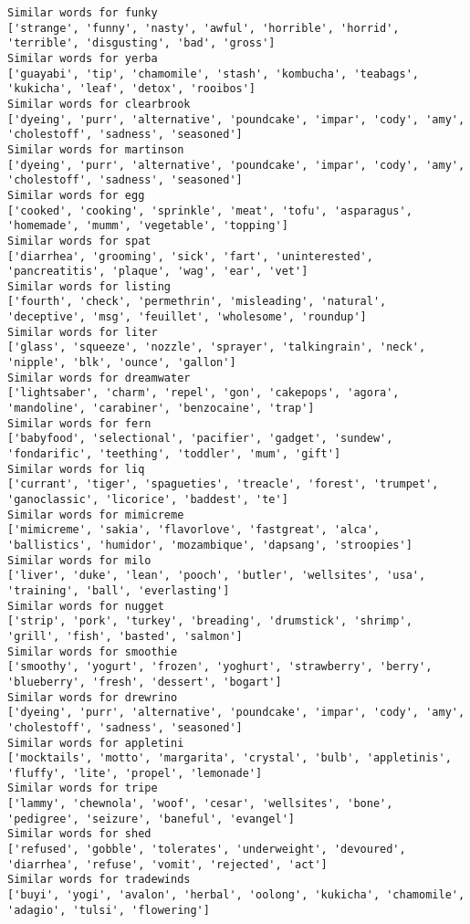 \documentclass[11pt]{article}
\begin{document}
\begin{Verbatim}[commandchars=\\\{\}]
Similar words for funky
['strange', 'funny', 'nasty', 'awful', 'horrible', 'horrid', 'terrible', 'disgusting', 'bad', 'gross']
Similar words for yerba
['guayabi', 'tip', 'chamomile', 'stash', 'kombucha', 'teabags', 'kukicha', 'leaf', 'detox', 'rooibos']
Similar words for clearbrook
['dyeing', 'purr', 'alternative', 'poundcake', 'impar', 'cody', 'amy', 'cholestoff', 'sadness', 'seasoned']
Similar words for martinson
['dyeing', 'purr', 'alternative', 'poundcake', 'impar', 'cody', 'amy', 'cholestoff', 'sadness', 'seasoned']
Similar words for egg
['cooked', 'cooking', 'sprinkle', 'meat', 'tofu', 'asparagus', 'homemade', 'mumm', 'vegetable', 'topping']
Similar words for spat
['diarrhea', 'grooming', 'sick', 'fart', 'uninterested', 'pancreatitis', 'plaque', 'wag', 'ear', 'vet']
Similar words for listing
['fourth', 'check', 'permethrin', 'misleading', 'natural', 'deceptive', 'msg', 'feuillet', 'wholesome', 'roundup']
Similar words for liter
['glass', 'squeeze', 'nozzle', 'sprayer', 'talkingrain', 'neck', 'nipple', 'blk', 'ounce', 'gallon']
Similar words for dreamwater
['lightsaber', 'charm', 'repel', 'gon', 'cakepops', 'agora', 'mandoline', 'carabiner', 'benzocaine', 'trap']
Similar words for fern
['babyfood', 'selectional', 'pacifier', 'gadget', 'sundew', 'fondarific', 'teething', 'toddler', 'mum', 'gift']
Similar words for liq
['currant', 'tiger', 'spagueties', 'treacle', 'forest', 'trumpet', 'ganoclassic', 'licorice', 'baddest', 'te']
Similar words for mimicreme
['mimicreme', 'sakia', 'flavorlove', 'fastgreat', 'alca', 'ballistics', 'humidor', 'mozambique', 'dapsang', 'stroopies']
Similar words for milo
['liver', 'duke', 'lean', 'pooch', 'butler', 'wellsites', 'usa', 'training', 'ball', 'everlasting']
Similar words for nugget
['strip', 'pork', 'turkey', 'breading', 'drumstick', 'shrimp', 'grill', 'fish', 'basted', 'salmon']
Similar words for smoothie
['smoothy', 'yogurt', 'frozen', 'yoghurt', 'strawberry', 'berry', 'blueberry', 'fresh', 'dessert', 'bogart']
Similar words for drewrino
['dyeing', 'purr', 'alternative', 'poundcake', 'impar', 'cody', 'amy', 'cholestoff', 'sadness', 'seasoned']
Similar words for appletini
['mocktails', 'motto', 'margarita', 'crystal', 'bulb', 'appletinis', 'fluffy', 'lite', 'propel', 'lemonade']
Similar words for tripe
['lammy', 'chewnola', 'woof', 'cesar', 'wellsites', 'bone', 'pedigree', 'seizure', 'baneful', 'evangel']
Similar words for shed
['refused', 'gobble', 'tolerates', 'underweight', 'devoured', 'diarrhea', 'refuse', 'vomit', 'rejected', 'act']
Similar words for tradewinds
['buyi', 'yogi', 'avalon', 'herbal', 'oolong', 'kukicha', 'chamomile', 'adagio', 'tulsi', 'flowering']

\end{Verbatim}
\end{document}
